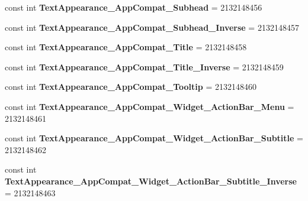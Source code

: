\begin{DoxyCompactItemize}
\item 
\mbox{\label{classst_delivery_1_1_resource_1_1_style_a5c5718007a008e7fa35832203f6708d7}} 
const int {\bfseries Text\+Appearance\+\_\+\+App\+Compat\+\_\+\+Subhead} = 2132148456
\item 
\mbox{\label{classst_delivery_1_1_resource_1_1_style_a28db1625615437973bb9bdcb5f922500}} 
const int {\bfseries Text\+Appearance\+\_\+\+App\+Compat\+\_\+\+Subhead\+\_\+\+Inverse} = 2132148457
\item 
\mbox{\label{classst_delivery_1_1_resource_1_1_style_a83ccc7e242c59226a5fde307a84967c9}} 
const int {\bfseries Text\+Appearance\+\_\+\+App\+Compat\+\_\+\+Title} = 2132148458
\item 
\mbox{\label{classst_delivery_1_1_resource_1_1_style_af7cf1a42571e155dbc3bfe5e01a8e7e1}} 
const int {\bfseries Text\+Appearance\+\_\+\+App\+Compat\+\_\+\+Title\+\_\+\+Inverse} = 2132148459
\item 
\mbox{\label{classst_delivery_1_1_resource_1_1_style_a38e4833559d1242ce2ecd8064770bd2f}} 
const int {\bfseries Text\+Appearance\+\_\+\+App\+Compat\+\_\+\+Tooltip} = 2132148460
\item 
\mbox{\label{classst_delivery_1_1_resource_1_1_style_a3b8f4a73da924de74a7f06b787a0c28a}} 
const int {\bfseries Text\+Appearance\+\_\+\+App\+Compat\+\_\+\+Widget\+\_\+\+Action\+Bar\+\_\+\+Menu} = 2132148461
\item 
\mbox{\label{classst_delivery_1_1_resource_1_1_style_a80956aa6d72d68838020eec554f53a6b}} 
const int {\bfseries Text\+Appearance\+\_\+\+App\+Compat\+\_\+\+Widget\+\_\+\+Action\+Bar\+\_\+\+Subtitle} = 2132148462
\item 
\mbox{\label{classst_delivery_1_1_resource_1_1_style_a88d42329ab67cc70a4688821ee2c89a0}} 
const int {\bfseries Text\+Appearance\+\_\+\+App\+Compat\+\_\+\+Widget\+\_\+\+Action\+Bar\+\_\+\+Subtitle\+\_\+\+Inverse} = 2132148463

\end{DoxyCompactItemize}
